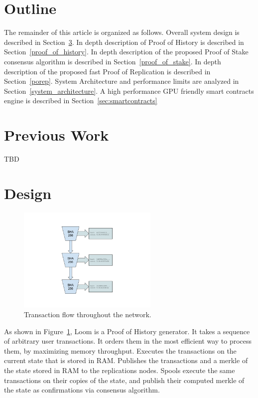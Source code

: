 \documentclass[12pt]{article}
\begin{document}
\section{Outline}
The remainder of this article is organized as follows. Overall system design is described in Section~\ref{design}. In depth description of Proof of History is described in Section~\ref{proof_of_history}. In depth description of the proposed Proof of Stake consensus algorithm is described in Section~\ref{proof_of_stake}. In depth description of the proposed fast Proof of Replication is described in Section~\ref{porep}. System Architecture and performance limits are analyzed in Section~\ref{system_architecture}. A high performance GPU friendly smart contracts engine is described in Section~\ref{sec:smartcontracts}

\section{Previous Work}\label{previous work}
TBD
\section{Design}\label{design}

\begin{figure}
  \begin{center}
    \centering
    \includegraphics[width=0.6\textwidth]{figures/fig_1.png}
    \caption[Fig 1]{Transaction flow throughout the network.\label{fig:design}}
  \end{center}
  \end{figure}

As shown in Figure~\ref{fig:design}, Loom is a Proof of History generator. It takes a sequence of arbitrary user transactions. It orders them in the most efficient way to process them, by maximizing memory throughput. Executes the transactions on the current state that is stored in RAM. Publishes the transactions and a merkle of the state stored in RAM to the replications nodes. Spools execute the same transactions on their copies of the state, and publish their computed merkle of the state as confirmations via consensus algorithm.
\end{document}
